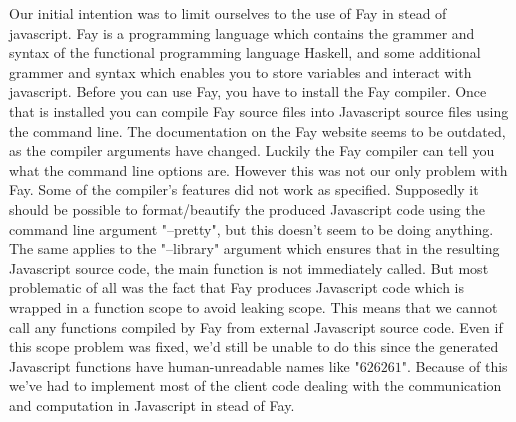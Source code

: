 Our initial intention was to limit ourselves to the use of Fay \cite{Fay} in stead of javascript. Fay is a programming language which contains the grammer and syntax of the functional programming language Haskell, and some additional grammer and syntax which enables you to store variables and interact with javascript. Before you can use Fay, you have to install the Fay compiler. Once that is installed you can compile Fay source files into Javascript source files using the command line. The documentation on the Fay website seems to be outdated, as the compiler arguments have changed. Luckily the Fay compiler can tell you what the command line options are. However this was not our only problem with Fay. Some of the compiler's features did not work as specified. Supposedly it should be possible to format/beautify the produced Javascript code using the command line argument "--pretty", but this doesn't seem to be doing anything. The same applies to the "--library" argument which ensures that in the resulting Javascript source code, the main function is not immediately called. But most problematic of all was the fact that Fay produces Javascript code which is wrapped in a function scope to avoid leaking scope. This means that we cannot call any functions compiled by Fay from external Javascript source code. Even if this scope problem was fixed, we'd still be unable to do this since the generated Javascript functions have human-unreadable names like "$62$$62$$61$". Because of this we've had to implement most of the client code dealing with the communication and computation in Javascript in stead of Fay.